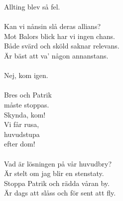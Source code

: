 \documentclass[a6paper, 10pt, twoside]{article}
\begin{document}
\begin{lyrics}
Allting blev så fel. \\
\\
Kan vi nånsin slå deras allians? \\
Mot Balors blick har vi ingen chans. \\
Både svärd och sköld saknar relevans. \\
Är bäst att va’ någon annanstans. \\
\\
Nej, kom igen. \\
\\
Bres och Patrik\\
måste stoppas. \\
Skynda, kom! \\
Vi får rusa, \\
huvudstupa \\
efter dom! \\
\\
Vad är lösningen på vår huvudbry? \\
Är stelt om jag blir en stenstaty. \\
Stoppa Patrik och rädda våran by. \\
Är dags att slåss och för sent att fly. 

\end{lyrics}

\end{document}
